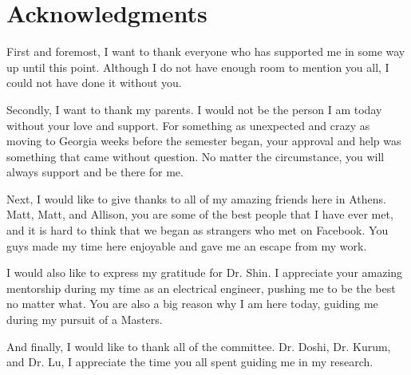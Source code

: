 \documentclass[./dissertation.tex]{subfiles}
\begin{document}
  \chapter*{Acknowledgments}

  First and foremost, I want to thank everyone who has supported me in some way up until this point. Although I do not have enough room to mention you all, I could not have done it without you. 

  Secondly, I want to thank my parents. I would not be the person I am today without your love and support. For something as unexpected and crazy as moving to Georgia weeks before the semester began, your approval and help was something that came without question. No matter the circumstance, you will always support and be there for me.

  Next, I would like to give thanks to all of my amazing friends here in Athens. Matt, Matt, and Allison, you are some of the best people that I have ever met, and it is hard to think that we began as strangers who met on Facebook. You guys made my time here enjoyable and gave me an escape from my work.

  I would also like to express my gratitude for Dr. Shin. I appreciate your amazing mentorship during my time as an electrical engineer, pushing me to be the best no matter what. You are also a big reason why I am here today, guiding me during my pursuit of a Masters.

  And finally, I would like to thank all of the committee. Dr. Doshi, Dr. Kurum, and Dr. Lu, I appreciate the time you all spent guiding me in my research.
\end{document}
